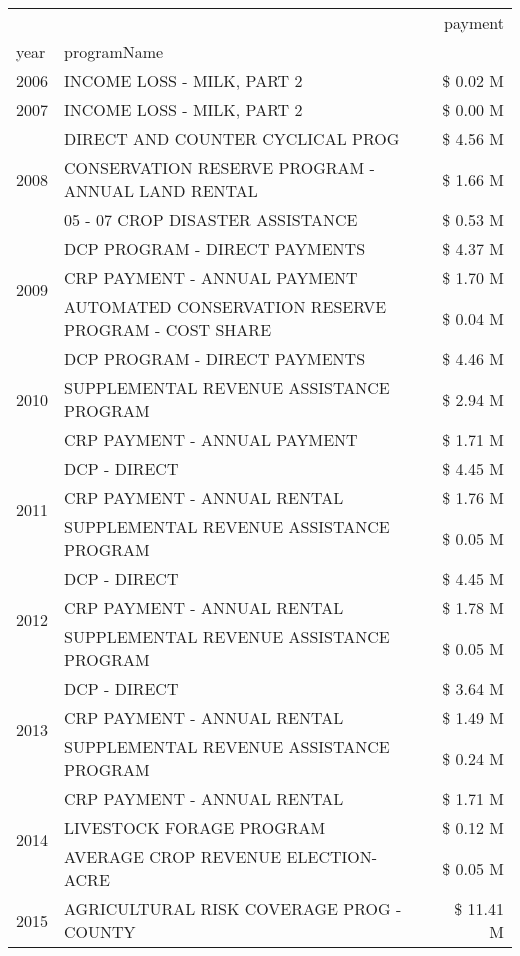 \begin{tabular}{llr}
\toprule
 &  & payment \\
year & programName &  \\
\midrule
2006 & INCOME LOSS - MILK, PART 2 & \$ 0.02 M \\
\cline{1-3}
2007 & INCOME LOSS - MILK, PART 2 & \$ 0.00 M \\
\cline{1-3}
\multirow[t]{3}{*}{2008} & DIRECT AND COUNTER CYCLICAL PROG & \$ 4.56 M \\
 & CONSERVATION RESERVE PROGRAM - ANNUAL LAND RENTAL & \$ 1.66 M \\
 & 05 - 07 CROP DISASTER ASSISTANCE & \$ 0.53 M \\
\cline{1-3}
\multirow[t]{3}{*}{2009} & DCP PROGRAM - DIRECT PAYMENTS & \$ 4.37 M \\
 & CRP PAYMENT - ANNUAL PAYMENT & \$ 1.70 M \\
 & AUTOMATED CONSERVATION RESERVE PROGRAM - COST SHARE & \$ 0.04 M \\
\cline{1-3}
\multirow[t]{3}{*}{2010} & DCP PROGRAM - DIRECT PAYMENTS & \$ 4.46 M \\
 & SUPPLEMENTAL REVENUE ASSISTANCE PROGRAM & \$ 2.94 M \\
 & CRP PAYMENT - ANNUAL PAYMENT & \$ 1.71 M \\
\cline{1-3}
\multirow[t]{3}{*}{2011} & DCP - DIRECT & \$ 4.45 M \\
 & CRP PAYMENT - ANNUAL RENTAL & \$ 1.76 M \\
 & SUPPLEMENTAL REVENUE ASSISTANCE PROGRAM & \$ 0.05 M \\
\cline{1-3}
\multirow[t]{3}{*}{2012} & DCP - DIRECT & \$ 4.45 M \\
 & CRP PAYMENT - ANNUAL RENTAL & \$ 1.78 M \\
 & SUPPLEMENTAL REVENUE ASSISTANCE PROGRAM & \$ 0.05 M \\
\cline{1-3}
\multirow[t]{3}{*}{2013} & DCP - DIRECT & \$ 3.64 M \\
 & CRP PAYMENT - ANNUAL RENTAL & \$ 1.49 M \\
 & SUPPLEMENTAL REVENUE ASSISTANCE PROGRAM & \$ 0.24 M \\
\cline{1-3}
\multirow[t]{3}{*}{2014} & CRP PAYMENT - ANNUAL RENTAL & \$ 1.71 M \\
 & LIVESTOCK FORAGE PROGRAM & \$ 0.12 M \\
 & AVERAGE CROP REVENUE ELECTION-ACRE & \$ 0.05 M \\
\cline{1-3}
\multirow[t]{3}{*}{2015} & AGRICULTURAL RISK COVERAGE PROG - COUNTY & \$ 11.41 M \\

\end{tabular}
